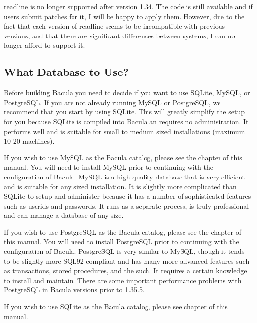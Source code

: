 {{{readline is no longer supported after version 1.34. The code is still
available and if users submit patches for it, I will be happy to apply them.
However, due to the fact that each version of readline seems to be
incompatible with previous versions, and that there are significant
differences between systems, I can no longer afford to support it. 

\subsection*{What Database to Use?}
\label{DB}

Before building Bacula you need to decide if you want to use SQLite, MySQL, or
PostgreSQL. If you are not already running MySQL or PostgreSQL, we recommend
that you start by using SQLite. This will greatly simplify the setup for you
because SQLite is compiled into Bacula an requires no administration. It
performs well and is suitable for small to medium sized installations (maximum
10-20 machines). 

If you wish to use MySQL as the Bacula catalog, please see the 
 chapter of
this manual. You will need to install MySQL prior to continuing with the
configuration of Bacula. MySQL is a high quality database that is very
efficient and is suitable for any sized installation. It is slightly more
complicated than SQLite to setup and administer because it has a number of
sophisticated features such as userids and passwords. It runs as a separate
process, is truly professional and can manage a database of any size. 

If you wish to use PostgreSQL as the Bacula catalog, please see the 
chapter of this manual. You will need to install PostgreSQL prior to
continuing with the configuration of Bacula. PostgreSQL is very similar to
MySQL, though it tends to be slightly more SQL92 compliant and has many more
advanced features such as transactions, stored procedures, and the such. It
requires a certain knowledge to install and maintain. There are some important
performance problems with PostgreSQL in Bacula versions prior to 1.35.5. 

If you wish to use SQLite as the Bacula catalog, please see 
 chapter of
this manual. 

}}}
